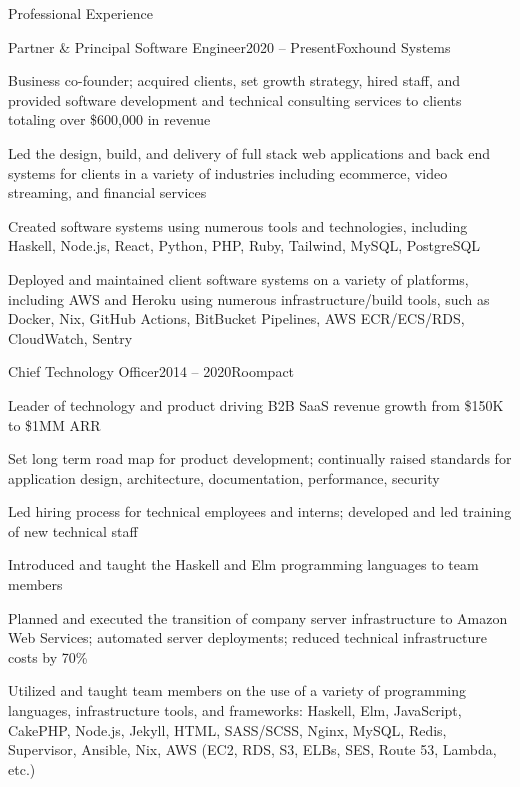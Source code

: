\documentclass{resume} %
\begin{document}

\begin{rSection}{Professional Experience}

\begin{rSubsection}{Partner \& Principal Software Engineer}{2020 -- Present}{Foxhound Systems}{}
  \item Business co-founder; acquired clients, set growth strategy, hired staff, and provided software development and technical consulting services to clients totaling over \$600,000 in revenue
  \item Led the design, build, and delivery of full stack web applications and back end systems for clients in a variety of industries including ecommerce, video streaming, and financial services
  \item Created software systems using numerous tools and technologies, including Haskell, Node.js, React, Python, PHP, Ruby, Tailwind, MySQL, PostgreSQL
  \item Deployed and maintained client software systems on a variety of platforms, including AWS and Heroku using numerous infrastructure/build tools, such as Docker, Nix, GitHub Actions, BitBucket Pipelines, AWS ECR/ECS/RDS, CloudWatch, Sentry
\end{rSubsection}


\begin{rSubsection}{Chief Technology Officer}{2014 -- 2020}{Roompact}{}
  \item Leader of technology and product driving B2B SaaS revenue growth from \$150K to \$1MM ARR
  \item Set long term road map for product development; continually raised standards for application design, architecture, documentation, performance, security
  \item Led hiring process for technical employees and interns; developed and led training of new technical staff
  \item Introduced and taught the Haskell and Elm programming languages to team members
  \item Planned and executed the transition of company server infrastructure to Amazon Web Services; automated server deployments; reduced technical infrastructure costs by 70\%
  \item Utilized and taught team members on the use of a variety of programming languages, infrastructure tools, and frameworks: Haskell, Elm, JavaScript, CakePHP, Node.js, Jekyll, HTML, SASS/SCSS, Nginx, MySQL, Redis, Supervisor, Ansible, Nix, AWS (EC2, RDS, S3, ELBs, SES, Route 53, Lambda, etc.)
\end{rSubsection}


\end{rSection}
\end{document}
